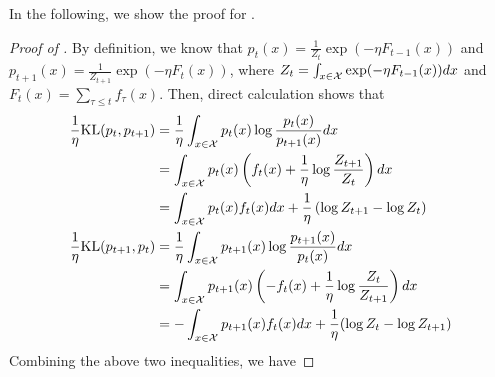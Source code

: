 In the following, we show the proof for .
\begin{proof}[Proof of ]
    By definition, we know that $p_t(x)=\frac{1}{Z_t}\exp(-\eta F_{t-1}(x))$ and $p_{t+1}(x)=\frac{1}{Z_{t+1}}\exp(-\eta F_{t}(x))$, where $Z_t = \int_{x\in{\mathcal{X}}}\exp(-\eta F_{t-1}(x))dx$ and $F_t(x) = \sum_{\tau\leq t}f_{\tau}(x)$.
    Then, direct calculation shows that
    \begin{align*}
        \frac{1}{\eta}\text{\rm KL}(p_t,p_{t+1})        &= \frac{1}{\eta}\int_{x\in{\mathcal{X}}}p_t(x)\log\frac{p_t(x)}{p_{t+1}(x)}dx\\
        &= \int_{x\in{\mathcal{X}}}p_t(x)\left(f_t(x)+\frac{1}{\eta}\log\frac{Z_{t+1}}{Z_{t}}\right)dx
        \\
        &= \int_{x\in{\mathcal{X}}}p_t(x)f_t(x)dx + \frac{1}{\eta}\left(\log Z_{t+1} - \log Z_t\right)
        \\
        \frac{1}{\eta}\text{\rm KL}(p_{t+1},p_{t})&= \frac{1}{\eta}\int_{x\in{\mathcal{X}}}p_{t+1}(x)\log\frac{p_{t+1}(x)}{p_{t}(x)}dx\\
        &= \int_{x\in{\mathcal{X}}}p_{t+1}(x)\left(-f_t(x)+\frac{1}{\eta}\log\frac{Z_{t}}{Z_{t+1}}\right)dx
        \\
        &= -\int_{x\in{\mathcal{X}}}p_{t+1}(x)f_t(x)dx +\frac{1}{\eta}( \log Z_{t} - \log Z_{t+1})
    \end{align*}
    Combining the above two inequalities, we have
   

\end{proof}
